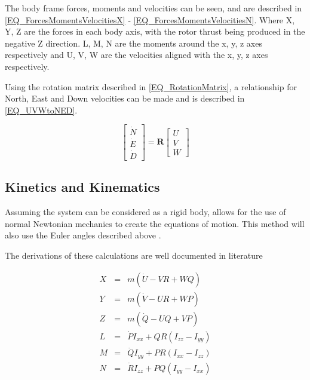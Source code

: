 		The body frame forces, moments and velocities can be seen, and are described in \eqref{EQ_ForcesMomentsVelocitiesX} - \eqref{EQ_ForcesMomentsVelocitiesN}. Where X, Y, Z are the forces in each body axis, with the rotor thrust being produced in the negative Z direction. L, M, N are the moments around the x, y, z axes respectively and U, V, W are the velocities aligned with the x, y, z axes respectively. 
		
		Using the rotation matrix described in \eqref{EQ_RotationMatrix}, a relationship for North, East and Down velocities can be made and is described in \eqref{EQ_UVWtoNED}. 
		
		\begin{equation}
		\begin{bmatrix} \dot{N}\\ \dot{E}\\ \dot{D} \end{bmatrix} = \textbf{R} \begin{bmatrix} U\\ V\\ W \end{bmatrix}
		\label{EQ_UVWtoNED}
		\end{equation}
				
	\subsection{Kinetics and Kinematics}
	
	Assuming the system can be considered as a rigid body, allows for the use of normal Newtonian mechanics to create the equations of motion. This method will also use the Euler angles described above \cite{Luukkonen, Modelling, Moller2015}.
	
	The derivations of these calculations are well documented in literature \cite{Blakelock}
	
	\begin{eqnarray}
	X &=&  m(\dot{U} - VR + WQ)\label{EQ_ForcesMomentsVelocitiesX}\\
	Y &=&  m(\dot{V} - UR + WP)\label{EQ_ForcesMomentsVelocitiesY}\\	
	Z &=&  m(\dot{Q} - UQ + VP)\label{EQ_ForcesMomentsVelocitiesZ}\\
	L &=&  \dot{P}I_{xx} + QR(I_{zz} - I_{yy})\label{EQ_ForcesMomentsVelocitiesL}\\
	M &=&  \dot{Q}I_{yy} + PR(I_{xx} - I_{zz})\label{EQ_ForcesMomentsVelocitiesM}\\	
	N &=&  \dot{R}I_{zz} + PQ(I_{yy} - I_{xx})\label{EQ_ForcesMomentsVelocitiesN}
	\end{eqnarray}
	
